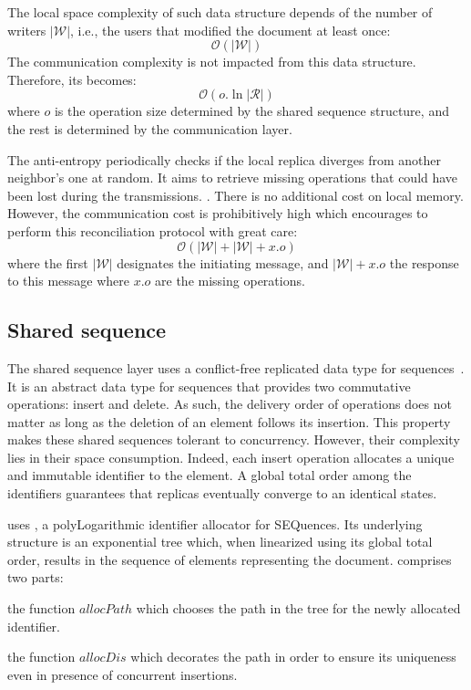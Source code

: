The local space complexity of such data structure depends of the number of
writers $|\mathcal{W}|$, i.e., the users that modified the document at least
once:
\begin{equation}
  \mathcal{O}(|\mathcal{W}|)
\end{equation}
The communication complexity is not impacted from this data
structure. Therefore, its becomes:
\begin{equation}
  \mathcal{O}(o.\ln |\mathcal{R}|)
\end{equation}
where $o$ is the operation size determined by the shared sequence structure,
and the rest is determined by the communication layer.

The anti-entropy periodically checks if the local replica diverges from another
neighbor's one at random. It aims to retrieve missing operations that could have
been lost during the transmissions. . There is no additional cost
on local memory. However, the communication cost is prohibitively high which
encourages to perform this reconciliation protocol with great care:
\begin{equation}
  \mathcal{O}(|\mathcal{W}|+|\mathcal{W}|+x.o)
\end{equation}
where the first $|\mathcal{W}|$ designates the initiating message, and
$|\mathcal{W}|+x.o$ the response to this message where $x.o$ are the missing
operations.

\subsection{Shared sequence}
The shared sequence layer uses a conflict-free replicated data type for
sequences~\cite{shapiro2011comprehensive, shapiro2011conflict}. It is an
abstract data type for sequences that provides two commutative operations:
insert and delete. As such, the delivery order of operations does not matter as
long as the deletion of an element follows its insertion. This property makes
these shared sequences tolerant to concurrency. However, their complexity lies
in their space consumption. Indeed, each insert operation allocates a unique and
immutable identifier to the element. A global total order among the identifiers
guarantees that replicas eventually converge to an identical states.

\CRATE uses \LSEQ, a polyLogarithmic identifier allocator for SEQuences. Its
underlying structure is an exponential tree which, when linearized using its
global total order, results in the sequence of elements representing the
document. \LSEQ comprises two parts:
\begin{inparaenum}[(i)]
\item the function $allocPath$ which chooses the path in the tree for the
  newly allocated identifier.
\item the function $allocDis$ which decorates the path in order to ensure its
  uniqueness even in presence of concurrent insertions.
\end{inparaenum}

